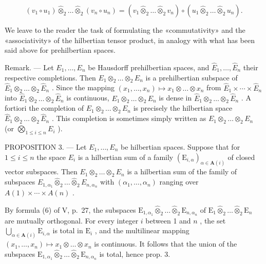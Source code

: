 \[
\left(v _ {1} \circ u _ {1}\right) \hat {\otimes} _ {2} \dots \hat {\otimes} _ {2} \left(v _ {n} \circ u _ {n}\right) = \left(v _ {1} \hat {\otimes} _ {2} \dots \hat {\otimes} _ {2} v _ {n}\right) \circ \left(u _ {1} \hat {\otimes} _ {2} \dots \hat {\otimes} _ {2} u _ {n}\right).\tag{12}
\]

We leave to the reader the task of formulating the «commutativity» and the «associativity» of the hilbertian tensor product, in analogy with what has been said above for prehilbertian spaces.

Remark. --- Let \(E_{1}, \ldots, E_{n}\) be Hausdorff prehilbertian spaces, and \(\hat{E}_{1}, \ldots, \hat{E}_{n}\) their respective completions. Then \(E_{1} \otimes_{2} \ldots \otimes_{2} E_{n}\) is a prehilbertian subspace of \(\hat{E}_{1} \otimes_{2} \ldots \otimes_{2} \hat{E}_{n}\) . Since the mapping \((x_{1}, \ldots, x_{n}) \mapsto x_{1} \otimes \ldots \otimes x_{n}\) from \(\hat{E}_{1} \times \cdots \times \hat{E}_{n}\) into \(\hat{E}_{1} \otimes_{2} \ldots \otimes_{2} \hat{E}_{n}\) is continuous, \(E_{1} \otimes_{2} \ldots \otimes_{2} E_{n}\) is dense in \(\hat{E}_{1} \otimes_{2} \ldots \otimes_{2} \hat{E}_{n}\) . A fortiori the completion of \(E_{1} \otimes_{2} \ldots \otimes_{2} E_{n}\) is precisely the hilbertian space \(\hat{E}_{1} \otimes_{2} \ldots \otimes_{2} \hat{E}_{n}\) . This completion is sometimes simply written as \(E_{1} \otimes_{2} \ldots \otimes_{2} E_{n}\) (or \(\bigotimes_{1 \leq i \leq n} E_{i}\) ).

PROPOSITION 3. --- Let \(E_{1}, \ldots, E_{n}\) be hilbertian spaces. Suppose that for \(1 \leqslant i \leqslant n\) the space \(E_{i}\) is a hilbertian sum of a family \((\mathrm{E}_{i,\alpha})_{\alpha \in \mathbf{A}(i)}\) of closed vector subspaces. Then \(E_{1} \otimes_{2} \ldots \otimes_{2} E_{n}\) is a hilbertian sum of the family of subspaces \(E_{1,\alpha_{1}} \hat{\otimes}_{2} \ldots \hat{\otimes}_{2} E_{n,\alpha_{n}}\) with \((\alpha_{1}, \ldots, \alpha_{n})\) ranging over \(A(1) \times \cdots \times A(n)\) .

By formula (6) of V, p.~27, the subspaces \(\mathrm{E}_{1,\alpha_1}\hat{\otimes}_2\ldots \hat{\otimes}_2\mathrm{E}_{n,\alpha_n}\) of \(\mathrm{E}_1\hat{\otimes}_2\ldots \hat{\otimes}_2\mathrm{E}_n\) are mutually orthogonal. For every integer \(i\) between 1 and \(n\) , the set \(\bigcup_{\alpha \in \mathbf{A}(i)}\mathrm{E}_{i,\alpha}\) is total in \(\mathrm{E}_i\) , and the multilinear mapping \((x_{1},\dots,x_{n})\mapsto x_{1}\otimes \dots \otimes x_{n}\) is continuous. It follows that the union of the subspaces \(\mathrm{E}_{1,\alpha_1}\hat{\otimes}_2\ldots \hat{\otimes}_2\mathrm{E}_{n,\alpha_n}\) is total, hence prop. 3.

